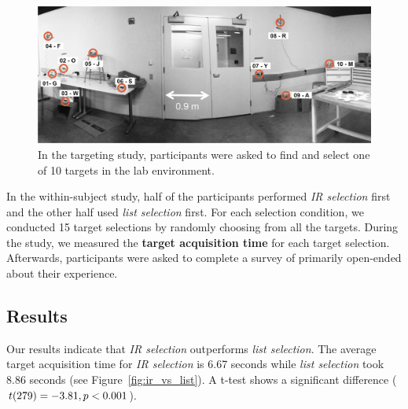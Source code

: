 \begin{figure}[t]
\centering
\includegraphics[width=1.0\columnwidth]{figures/study-layout1.png}
\caption{In the targeting study, participants were asked to find and select one of 10 targets in the lab environment.}
\label{fig:targeting-study-layout}
\end{figure}

In the within-subject study, half of the participants performed {\em IR selection} first and the other half used {\em list selection} first. For each selection condition, we conducted 15 target selections by randomly choosing from all the targets. During the study, we measured the {\bf target acquisition time} for each target selection.  Afterwards, participants were asked to complete a survey of primarily open-ended  about their experience.

\newpage %
\subsection{Results}
Our results indicate that {\em IR selection} outperforms {\em list selection}.  The average target acquisition time for {\em IR selection} is 6.67 seconds 
while {\em list selection} took 8.86 seconds (see Figure~\ref{fig:ir_vs_list}). A t-test shows a significant difference ($t(279)=-3.81, {p < 0.001}$).

